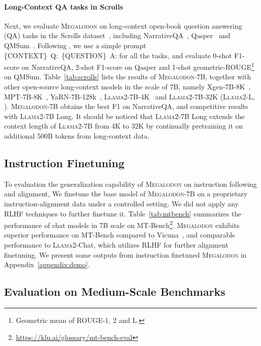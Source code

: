 \paragraph{Long-Context QA tasks in Scrolls} Next, we evaluate \textsc{Megalodon} on long-context open-book question answering (QA) tasks in the Scrolls dataset~\citep{shaham-etal-2022-scrolls}, including NarrativeQA~\citep{kocisky-etal-2018-narrativeqa}, Qasper~\citep{dasigi-etal-2021-dataset} and QMSum~\citep{zhong-etal-2021-qmsum}. Following \citet{xiong2023effective}, we use a simple prompt \mbox{\{\textup{CONTEXT}\} Q: \{\textup{QUESTION}\} A:} for all the tasks, and evaluate 0-shot F1-score on NarrativeQA, 2-shot F1-score on Qasper and 1-shot geometric-ROUGE\footnote{Geometric mean of ROUGE-1, 2 and L.} on QMSum.
Table~\ref{tab:scrolls} lists the results of \textsc{Megalodon}-7B, together with other open-source long-context models in the scale of 7B, namely Xgen-7B-8K~\citep{nijkamp2023xgen7b}, MPT-7B-8K~\citep{mpt7b}, YaRN-7B-128k~\citep{peng2024yarn}, \textsc{Llama}2-7B-4K~\citep{touvron2023llama} and \textsc{Llama}2-7B-32K (\textsc{Llama}2-L, \citet{xiong2023effective}).
\textsc{Megalodon}-7B obtains the best F1 on NarrativeQA, and competitive results with \textsc{Llama}2-7B Long. It should be noticed that \textsc{Llama}2-7B Long extends the context length of \textsc{Llama}2-7B from 4K to 32K by continually pretraining it on additional 500B tokens from long-context data.

\subsection{Instruction Finetuning} To evaluation the generalization capability of \textsc{Megalodon} on instruction following and alignment, We finetune the base model of \textsc{Megalodon}-7B on a proprietary instruction-alignment data under a controlled setting. We did not apply any RLHF techniques to further finetune it.
Table~\ref{tab:mtbench} summarizes the performance of chat models in 7B scale on MT-Bench\footnote{\url{https://klu.ai/glossary/mt-bench-eval}}. 
\textsc{Megalodon} exhibits superior performance on MT-Bench compared to Vicuna~\citep{vicuna2023}, and comparable performance to \textsc{Llama}2-Chat, which utilizes RLHF for further alignment finetuning. We present some outputs from instruction finetuned \textsc{Megalodon} in Appendix~\ref{appendix:demo}.

\subsection{Evaluation on Medium-Scale Benchmarks}

